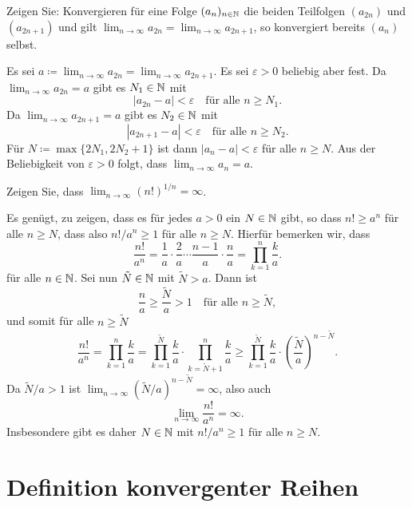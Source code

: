 \documentclass[a4paper,10pt]{article}
\begin{document}
\begin{question}
 Zeigen Sie: Konvergieren für eine Folge $(a_n)_{n \in \mathbb{N}}$ die beiden Teilfolgen $(a_{2n})$ und $(a_{2n+1})$ und gilt $\lim_{n \to \infty} a_{2n} = \lim_{n \to \infty} a_{2n+1}$, so konvergiert bereits $(a_n)$ selbst.
\end{question}
\begin{solution}
 Es sei $a \coloneqq \lim_{n \to \infty} a_{2n} = \lim_{n \to \infty} a_{2n+1}$. Es sei $\varepsilon > 0$ beliebig aber fest. Da $\lim_{n \to \infty} a_{2n} = a$ gibt es $N_1 \in \mathbb{N}$ mit
 \[
  |a_{2n} - a| < \varepsilon \quad \text{für alle $n \geq N_1$}.
 \]
 Da $\lim_{n \to \infty} a_{2n+1} = a$ gibt es $N_2 \in \mathbb{N}$ mit
 \[
  |a_{2n+1} - a| < \varepsilon \quad \text{für alle $n \geq N_2$}.
 \]
 Für $N \coloneqq \max \{2N_1, 2N_2+1\}$ ist dann $|a_n - a| < \varepsilon$ für alle $n \geq N$. Aus der Beliebigkeit von $\varepsilon > 0$ folgt, dass $\lim_{n \to \infty} a_n = a$.
\end{solution}


\begin{question}
 Zeigen Sie, dass $\lim_{n \to \infty} (n!)^{1/n} = \infty$.
\end{question}
\begin{solution}
 Es genügt, zu zeigen, dass es für jedes $a > 0$ ein $N \in \mathbb{N}$ gibt, so dass $n! \geq a^n$ für alle $n \geq N$, dass also $n!/a^n \geq 1$ für alle $n \geq N$. Hierfür bemerken wir, dass
 \[
  \frac{n!}{a^n}
  = \frac{1}{a} \cdot \frac{2}{a} \dotsm \frac{n-1}{a} \cdot \frac{n}{a}
  = \prod_{k=1}^n \frac{k}{a}.
 \]
 für alle $n \in \mathbb{N}$. Sei nun $\tilde{N} \in \mathbb{N}$ mit $\tilde{N} > a$. Dann ist
 \[
  \frac{n}{a} \geq \frac{\tilde{N}}{a} > 1 \quad \text{für alle $n \geq \tilde{N}$},
 \]
 und somit für alle $n \geq \tilde{N}$
 \[
  \frac{n!}{a^n}
  = \prod_{k=1}^{n} \frac{k}{a}
  = \prod_{k=1}^{\tilde{N}} \frac{k}{a} \cdot \prod_{k=\tilde{N}+1}^n \frac{k}{a}
  \geq \prod_{k=1}^{\tilde{N}} \frac{k}{a} \cdot \left(\frac{\tilde{N}}{a}\right)^{n-\tilde{N}}.
 \]
 Da $\tilde{N}/a > 1$ ist $\lim_{n \to \infty} (\tilde{N}/a)^{n-\tilde{N}} = \infty$, also auch
 \[
  \lim_{n \to \infty} \frac{n!}{a^n} = \infty.
 \]
 Insbesondere gibt es daher $N \in \mathbb{N}$ mit $n!/a^n \geq 1$ für alle $n \geq N$.
\end{solution}





\section{Definition konvergenter Reihen}
\end{document}
